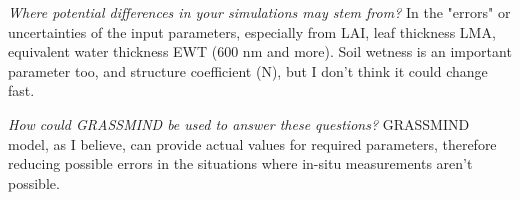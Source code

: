 \documentclass[a4paper,12pt]{article}
\begin{document}
\textit{Where potential differences in your simulations may stem from?} 
In the "errors" or uncertainties of the input parameters, especially from LAI, leaf thickness LMA, equivalent water thickness EWT (600 nm and more). Soil wetness is an important parameter too, and structure coefficient (N), but I don't think it could change fast.

\textit{How could GRASSMIND be used to answer these questions?} 
GRASSMIND model, as I believe, can provide actual values for required parameters, therefore reducing possible errors in the situations where in-situ measurements aren't possible.
\end{document}
